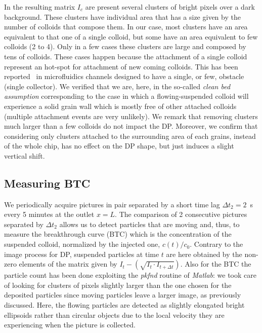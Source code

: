 \documentclass[singlecolumn,pre,notitlepage,preprintnumbers,floatfix,superscriptaddress]{revtex4-1}
\begin{document}
\noindent
In the resulting matrix $I_c$ are present several clusters of bright pixels over a dark background. These clusters have individual area that has a size given by the number of colloids that compose them. In our case, most clusters have an area equivalent to that one of a single colloid, but some have an area equivalent to few colloids (2 to 4). Only in a few cases these clusters are large and composed by tens of colloids. These cases happen because the attachment of a single colloid represent an hot-spot for attachment of new coming colloids. This has been reported~\cite{Herve2015} in microfluidics channels designed to have a single, or few, obstacle (single collector). We verified that we are, here, in the so-called \emph{clean bed assumption} corresponding to the case in which a flowing-suspended colloid will experience a solid grain wall which is mostly free of other attached colloids (multiple attachment events are very unlikely). We remark that removing clusters much larger than a few colloids do not impact the DP. Moreover, we confirm that considering only clusters attached to the surrounding area of each grains, instead of the whole chip, has no effect on the DP shape, but just induces a slight vertical shift. \\

\subsection*{Measuring BTC}
\noindent
We periodically acquire pictures in pair separated by a short time lag $\Delta t_2 = 2$~s every 5 minutes at the outlet $x = L$. The comparison of 2 consecutive pictures separated by $\Delta t_2$ allows us to detect particles that are moving and, thus, to measure the breakthrough curve (BTC) which is the concentration of the suspended colloid, normalized by the injected one, $c(t)/c_0$. Contrary to the image process for DP, suspended particles at time $t$ are here obtained by the non-zero elements of the matrix given by $I_t - \left( \sqrt{I_t \cdot I_{t+\Delta t}}\right)$. Also for the BTC the particle count has been done exploiting the \emph{pkfnd} routine of \emph{Matlab}: we took care of looking for clusters of pixels slightly larger than the one chosen for the deposited particles since moving particles leave a larger image, as previously discussed. Here, the flowing particles are detected as slightly elongated bright ellipsoids rather than circular objects due to the local velocity they are experiencing when the picture is collected. \\
\end{document}
